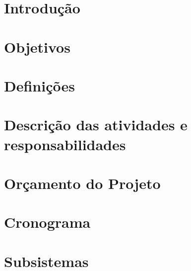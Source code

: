 \chapter{Introdução}


\chapter{Objetivos}


\chapter{Definições}


\chapter{Descrição das atividades e responsabilidades}


\chapter{Orçamento do Projeto}


\chapter{Cronograma}


\chapter{Subsistemas}

